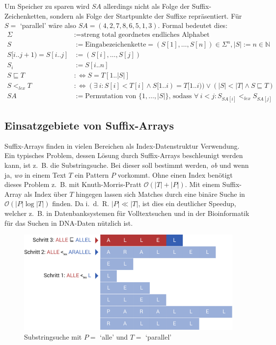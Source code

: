 \documentclass[twoside,11pt]{article}
\theoremstyle{break}
\begin{document}
Um Speicher zu sparen wird $SA$ allerdings nicht als Folge der Suffix-Zeichenketten, sondern als Folge der Startpunkte der Suffixe repräsentiert. Für $S =$ `parallel' wäre also $SA = (4, 2, 7, 8, 6, 5, 1, 3)$. Formal bedeutet dies:
\begin{align*}
	\Sigma &:= \text{streng total geordnetes endliches Alphabet} \\
	S &:= \text{Eingabezeichenkette} = (S[1], \dots, S[n]) \in \Sigma^n, |S| := n \in \mathbb{N} \\
	S[i .. j + 1) = S[i .. j] &:= (S[i], \dots, S[j]) \\
	S_i &:= S[i .. n] \\
	S \sqsubseteq T &:\Leftrightarrow S = T[1 .. |S|] \\
	S <_{lex} T &:\Leftrightarrow (\exists\ i: S[i] < T[i] \land S[1 .. i) = T[1 .. i)) \lor (|S| < |T| \land S \sqsubseteq T) \\
	SA &:= \text{Permutation von } \{1, \dots, |S|\} \text{, sodass } \forall\ i < j: S_{SA[i]} <_{lex} S_{SA[j]}
\end{align*}

\subsection{Einsatzgebiete von Suffix-Arrays}

Suffix-Arrays finden in vielen Bereichen als Index-Datenstruktur Verwendung. Ein typisches Problem, dessen Lösung durch Suffix-Arrays beschleunigt werden kann, ist z.~B. die Substringsuche. Bei dieser soll bestimmt werden, \textit{ob} und wenn ja, \textit{wo} in einem Text $T$ ein Pattern $P$ vorkommt. Ohne einen Index benötigt dieses Problem z.~B. mit Knuth-Morris-Pratt $\mathcal{O}(|T| + |P|)$. Mit einem Suffix-Array als Index über $T$ hingegen lassen sich Matches durch eine binäre Suche in $\mathcal{O}(|P| \log |T|)$ finden. Da i.~d.~R. $|P| \ll |T|$, ist dies ein deutlicher Speedup, welcher z.~B. in Datenbanksystemen für Volltextsuchen und in der Bioinformatik für das Suchen in DNA-Daten nützlich ist.

\begin{figure}[h]
	\centering
	\includegraphics[width=0.7\linewidth,bb=0 0 1010 462]{./assets/substringSearch.pdf}
	\caption{Substringsuche mit $P =$ `alle' und $T =$ `parallel'}
\label{fig:substringSearch}
\end{figure}
\end{document}

